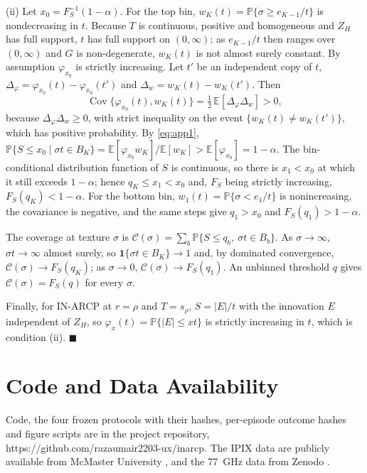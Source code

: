\documentclass[journal]{IEEEtran}
\newcommand{\PP}{\mathbb{P}}
\begin{document}
(ii) Let $x_0=F_S^{-1}(1-\alpha)$. For the top bin, $w_K(t)=\PP\{\sigma\ge e_{K-1}/t\}$ is nondecreasing in $t$. Because $T$ is continuous, positive and homogeneous and $Z_H$ has full support, $t$ has full support on $(0,\infty)$; as $e_{K-1}/t$ then ranges over $(0,\infty)$ and $G$ is non-degenerate, $w_K(t)$ is not almost surely constant. By assumption $\varphi_{x_0}$ is strictly increasing. Let $t'$ be an independent copy of $t$, $\Delta_\varphi=\varphi_{x_0}(t)-\varphi_{x_0}(t')$ and $\Delta_w=w_K(t)-w_K(t')$. Then
\[
\operatorname{Cov}\{\varphi_{x_0}(t),w_K(t)\}=\tfrac12\,\mathbb E[\Delta_\varphi\Delta_w]>0,
\]
because $\Delta_\varphi\Delta_w\ge0$, with strict inequality on the event $\{w_K(t)\ne w_K(t')\}$, which has positive probability. By \eqref{eq:app1},
$\PP\{S\le x_0\mid\sigma t\in B_K\}=\mathbb E[\varphi_{x_0}w_K]/\mathbb E[w_K]>\mathbb E[\varphi_{x_0}]=1-\alpha$.
The bin-conditional distribution function of $S$ is continuous, so there is $x_1<x_0$ at which it still exceeds $1-\alpha$; hence $q_K\le x_1<x_0$ and, $F_S$ being strictly increasing, $F_S(q_K)<1-\alpha$. For the bottom bin, $w_1(t)=\PP\{\sigma<e_1/t\}$ is nonincreasing, the covariance is negative, and the same steps give $q_1>x_0$ and $F_S(q_1)>1-\alpha$.

The coverage at texture $\sigma$ is $\mathcal C(\sigma)=\sum_b\PP\{S\le q_b,\ \sigma t\in B_b\}$. As $\sigma\to\infty$, $\sigma t\to\infty$ almost surely, so $\mathbf 1\{\sigma t\in B_K\}\to1$ and, by dominated convergence, $\mathcal C(\sigma)\to F_S(q_K)$; as $\sigma\to0$, $\mathcal C(\sigma)\to F_S(q_1)$. An unbinned threshold $q$ gives $\mathcal C(\sigma)=F_S(q)$ for every $\sigma$.

Finally, for IN-ARCP at $r=\rho$ and $T=s_\rho$, $S=|E|/t$ with the innovation $E$ independent of $Z_H$, so $\varphi_x(t)=\PP\{|E|\le xt\}$ is strictly increasing in $t$, which is condition (ii). \hfill$\blacksquare$

\section*{Code and Data Availability}
Code, the four frozen protocols with their hashes, per-episode outcome hashes and figure scripts are in the project repository, https://github.com/razaumair2203-ux/inarcp. The IPIX data are publicly available from McMaster University \cite{ipixweb}, and the 77~GHz data from Zenodo \cite{jku2026}.
\end{document}

